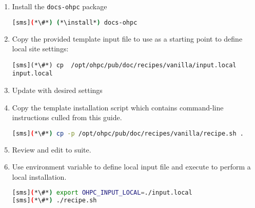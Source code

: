 \begin{enumerate}
\item Install the \texttt{docs-ohpc} package

\begin{lstlisting}[language=bash,keywords={}]
[sms](*\#*) (*\install*) docs-ohpc
\end{lstlisting}

\item Copy the provided template input file to use as a starting point to
  define local site settings:
\begin{lstlisting}
[sms](*\#*) cp  /opt/ohpc/pub/doc/recipes/vanilla/input.local input.local
\end{lstlisting}

\item Update  with desired settings

\item Copy the template installation script which contains command-line
  instructions culled from this guide.

\begin{lstlisting}[language=bash,keywords={}]
[sms](*\#*) cp -p /opt/ohpc/pub/doc/recipes/vanilla/recipe.sh .
\end{lstlisting}

\item Review and edit  to suite.

\item Use environment variable to define local input file and execute
   to perform a local installation.

\begin{lstlisting}[language=bash,keywords={}]
[sms](*\#*) export OHPC_INPUT_LOCAL=./input.local
[sms](*\#*) ./recipe.sh
\end{lstlisting}
\end{enumerate}



